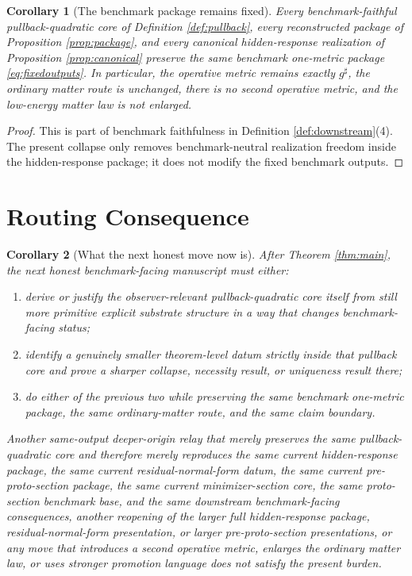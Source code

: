 \documentclass[11pt]{article}
\newcommand{\CompletedMetric}{g^{\sharp}}
\newtheorem{corollary}{Corollary}
\begin{document}
\begin{corollary}[The benchmark package remains fixed]
\label{cor:benchmark}
Every benchmark-faithful pullback-quadratic core of Definition \ref{def:pullback}, every reconstructed package of Proposition \ref{prop:package}, and every canonical hidden-response realization of Proposition \ref{prop:canonical} preserve the same benchmark one-metric package \eqref{eq:fixedoutputs}. In particular, the operative metric remains exactly \(\CompletedMetric\), the ordinary matter route is unchanged, there is no second operative metric, and the low-energy matter law is not enlarged.
\end{corollary}

\begin{proof}
This is part of benchmark faithfulness in Definition \ref{def:downstream}(4). The present collapse only removes benchmark-neutral realization freedom inside the hidden-response package; it does not modify the fixed benchmark outputs.
\end{proof}

\section{Routing Consequence}

\begin{corollary}[What the next honest move now is]
\label{cor:next}
After Theorem \ref{thm:main}, the next honest benchmark-facing manuscript must either:
\begin{enumerate}
    \item derive or justify the observer-relevant pullback-quadratic core itself from still more primitive explicit substrate structure in a way that changes benchmark-facing status;
    \item identify a genuinely smaller theorem-level datum strictly inside that pullback core and prove a sharper collapse, necessity result, or uniqueness result there;
    \item do either of the previous two while preserving the same benchmark one-metric package, the same ordinary-matter route, and the same claim boundary.
\end{enumerate}
Another same-output deeper-origin relay that merely preserves the same pullback-quadratic core and therefore merely reproduces the same current hidden-response package, the same current residual-normal-form datum, the same current pre-proto-section package, the same current minimizer-section core, the same proto-section benchmark base, and the same downstream benchmark-facing consequences, another reopening of the larger full hidden-response package, residual-normal-form presentation, or larger pre-proto-section presentations, or any move that introduces a second operative metric, enlarges the ordinary matter law, or uses stronger promotion language does not satisfy the present burden.
\end{corollary}
\end{document}
